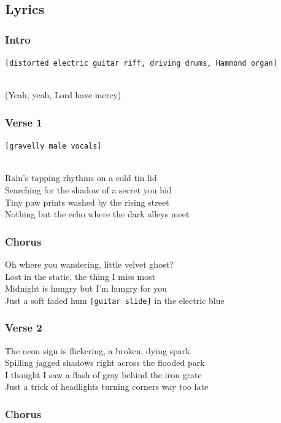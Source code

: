 \subsection{Lyrics}\label{lyrics-20}

\subsubsection{Intro}\label{intro-2}

\texttt{{[}distorted\ electric\ guitar\ riff,\ driving\ drums,\ Hammond\ organ{]}}\strut \\
(Yeah, yeah, Lord have mercy)

\subsubsection{Verse 1}\label{verse-1-12}

\texttt{{[}gravelly\ male\ vocals{]}}\strut \\
Rain's tapping rhythms on a cold tin lid\\
Searching for the shadow of a secret you hid\\
Tiny paw prints washed by the rising street\\
Nothing but the echo where the dark alleys meet

\subsubsection{Chorus}\label{chorus-31}

Oh where you wandering, little velvet ghost?\\
Lost in the static, the thing I miss most\\
Midnight is hungry but I'm hungry for you\\
Just a soft faded hum \texttt{{[}guitar\ slide{]}} in the electric blue

\subsubsection{Verse 2}\label{verse-2-13}

The neon sign is flickering, a broken, dying spark\\
Spilling jagged shadows right across the flooded park\\
I thought I saw a flash of gray behind the iron grate\\
Just a trick of headlights turning corners way too late

\subsubsection{Chorus}\label{chorus-32}


